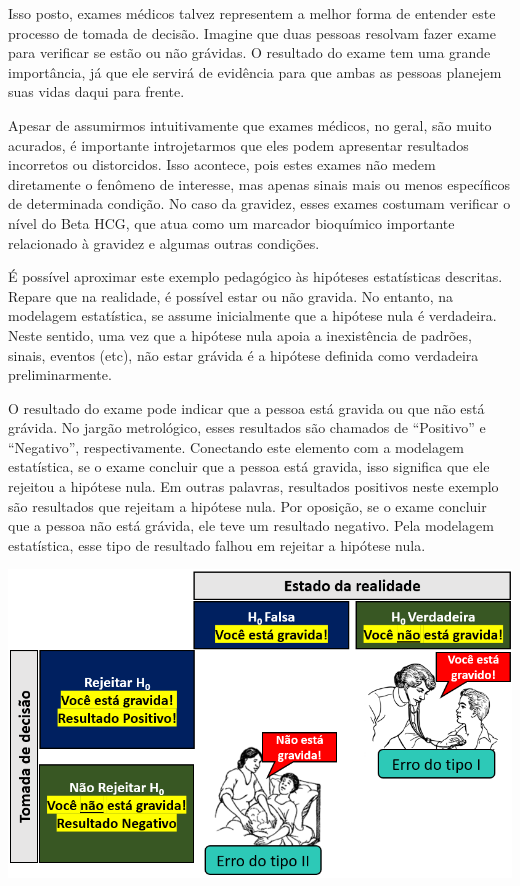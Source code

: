 \documentclass[
]{book}
\begin{document}
Isso posto, exames médicos talvez representem a melhor forma de entender este processo de tomada de decisão. Imagine que duas pessoas resolvam fazer exame para verificar se estão ou não grávidas. O resultado do exame tem uma grande importância, já que ele servirá de evidência para que ambas as pessoas planejem suas vidas daqui para frente.

Apesar de assumirmos intuitivamente que exames médicos, no geral, são muito acurados, é importante introjetarmos que eles podem apresentar resultados incorretos ou distorcidos. Isso acontece, pois estes exames não medem diretamente o fenômeno de interesse, mas apenas sinais mais ou menos específicos de determinada condição. No caso da gravidez, esses exames costumam verificar o nível do Beta HCG, que atua como um marcador bioquímico importante relacionado à gravidez e algumas outras condições.

É possível aproximar este exemplo pedagógico às hipóteses estatísticas descritas. Repare que na realidade, é possível estar ou não gravida. No entanto, na modelagem estatística, se assume inicialmente que a hipótese nula é verdadeira. Neste sentido, uma vez que a hipótese nula apoia a inexistência de padrões, sinais, eventos (etc), não estar grávida é a hipótese definida como verdadeira preliminarmente.

O resultado do exame pode indicar que a pessoa está gravida ou que não está grávida. No jargão metrológico, esses resultados são chamados de ``Positivo'' e ``Negativo'', respectivamente. Conectando este elemento com a modelagem estatística, se o exame concluir que a pessoa está gravida, isso significa que ele rejeitou a hipótese nula. Em outras palavras, resultados positivos neste exemplo são resultados que rejeitam a hipótese nula. Por oposição, se o exame concluir que a pessoa não está grávida, ele teve um resultado negativo. Pela modelagem estatística, esse tipo de resultado falhou em rejeitar a hipótese nula.

\includegraphics{./img/cap_inferencia_tabela_decisao2.png}
\end{document}
